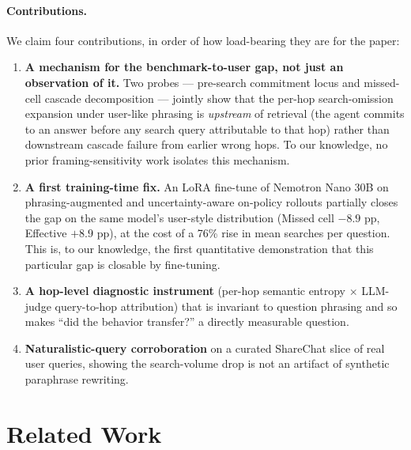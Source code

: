 \documentclass[10pt,letterpaper]{article}
\begin{document}
\paragraph{Contributions.}
We claim four contributions, in order of how load-bearing they are for the paper:
\begin{enumerate}[leftmargin=*,topsep=2pt,itemsep=2pt]
  \item \textbf{A mechanism for the benchmark-to-user gap, not just an observation
  of it.} Two probes --- pre-search commitment locus and missed-cell cascade
  decomposition --- jointly show that the per-hop search-omission expansion under
  user-like phrasing is \emph{upstream} of retrieval (the agent commits to an
  answer before any search query attributable to that hop) rather than downstream
  cascade failure from earlier wrong hops. To our knowledge, no prior
  framing-sensitivity work
  \citep{howask2026,knowingdoing2026,rabinovich2025agentic} isolates this mechanism.
  \item \textbf{A first training-time fix.} An LoRA fine-tune of Nemotron Nano 30B
  on phrasing-augmented and uncertainty-aware on-policy rollouts partially closes
  the gap on the same model's user-style distribution (Missed cell $-8.9$ pp,
  Effective $+8.9$ pp), at the cost of a 76\% rise in mean searches per question.
  This is, to our knowledge, the first quantitative demonstration that this
  particular gap is closable by fine-tuning.
  \item \textbf{A hop-level diagnostic instrument} (per-hop semantic entropy
  $\times$ LLM-judge query-to-hop attribution) that is invariant to question
  phrasing and so makes ``did the behavior transfer?'' a directly measurable
  question.
  \item \textbf{Naturalistic-query corroboration} on a curated ShareChat slice of
  real user queries, showing the search-volume drop is not an artifact of synthetic
  paraphrase rewriting.
\end{enumerate}

\section{Related Work}\label{sec:related}
\end{document}
